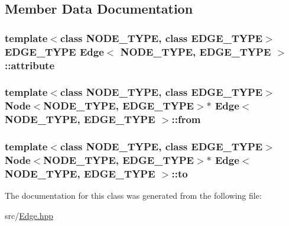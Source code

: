 \subsection{Member Data Documentation}
\hypertarget{class_edge_ae49cc056dfa848b0a1beef821d81a31d}{
\subsubsection[{attribute}]{\setlength{\rightskip}{0pt plus 5cm}template$<$class N\+O\+D\+E\+\_\+\+T\+Y\+P\+E, class E\+D\+G\+E\+\_\+\+T\+Y\+P\+E$>$ E\+D\+G\+E\+\_\+\+T\+Y\+P\+E {\bf Edge}$<$ N\+O\+D\+E\+\_\+\+T\+Y\+P\+E, E\+D\+G\+E\+\_\+\+T\+Y\+P\+E $>$\+::attribute\hspace{0.3cm}{\ttfamily [private]}}}\label{class_edge_ae49cc056dfa848b0a1beef821d81a31d}
\hypertarget{class_edge_a1bffa41df2941b7d55c59a5031f78e14}{
\subsubsection[{from}]{\setlength{\rightskip}{0pt plus 5cm}template$<$class N\+O\+D\+E\+\_\+\+T\+Y\+P\+E, class E\+D\+G\+E\+\_\+\+T\+Y\+P\+E$>$ {\bf Node}$<$N\+O\+D\+E\+\_\+\+T\+Y\+P\+E, E\+D\+G\+E\+\_\+\+T\+Y\+P\+E$>$$\ast$ {\bf Edge}$<$ N\+O\+D\+E\+\_\+\+T\+Y\+P\+E, E\+D\+G\+E\+\_\+\+T\+Y\+P\+E $>$\+::from\hspace{0.3cm}{\ttfamily [private]}}}\label{class_edge_a1bffa41df2941b7d55c59a5031f78e14}
\hypertarget{class_edge_a7ba6dee1554e4a0a7cf69862e90fdd85}{
\subsubsection[{to}]{\setlength{\rightskip}{0pt plus 5cm}template$<$class N\+O\+D\+E\+\_\+\+T\+Y\+P\+E, class E\+D\+G\+E\+\_\+\+T\+Y\+P\+E$>$ {\bf Node}$<$N\+O\+D\+E\+\_\+\+T\+Y\+P\+E, E\+D\+G\+E\+\_\+\+T\+Y\+P\+E$>$$\ast$ {\bf Edge}$<$ N\+O\+D\+E\+\_\+\+T\+Y\+P\+E, E\+D\+G\+E\+\_\+\+T\+Y\+P\+E $>$\+::to\hspace{0.3cm}{\ttfamily [private]}}}\label{class_edge_a7ba6dee1554e4a0a7cf69862e90fdd85}


The documentation for this class was generated from the following file\+:\begin{DoxyCompactItemize}
\item 
src/\hyperlink{_edge_8hpp}{Edge.\+hpp}\end{DoxyCompactItemize}
